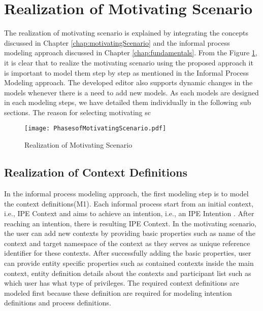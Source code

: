 \section{Realization of Motivating Scenario}
\label{sec:realization}
The realization of motivating scenario is explained by integrating the concepts discussed in Chapter \ref{chap:motivatingScenario} and the informal process modeling approach discussed in Chapter \ref{chap:fundamentals}. From the Figure \ref{fig:realizationofmotivatingscenario}, it is clear that to realize the motivating scenario using the proposed approach it is important to model them step by step as mentioned in the Informal Process Modeling approach. The developed editor also supports dynamic changes in the models whenever there is a need to add new models. As each models are designed in each modeling steps, we have detailed them individually in the following sub sections. The reason for selecting motivating sc

\begin{figure}
	\centering
	\texttt{[image: PhasesofMotivatingScenario.pdf]}
	\caption{Realization of Motivating Scenario}
	\label{fig:realizationofmotivatingscenario}
\end{figure}

\subsection{Realization of Context Definitions}
In the informal process modeling approach, the first modeling step is to model the context definitions(M1). Each informal process start from an initial context, i.e., IPE Context and aims to achieve an intention, i.e., an IPE Intention \cite{Sungur2014a}. After reaching an intention, there is resulting IPE Context. In the motivating scenario, the user can add new contexts by providing basic properties such as name of the context and target namespace of the context as they serves as unique reference identifier for these contexts. After successfully adding the basic properties, user can provide entity specific properties such as contained contexts inside the main context, entity definition details about the contexts and participant list such as which user has what type of privileges. The required context definitions are modeled first because these definition are required for modeling intention definitions and process definitions.  

